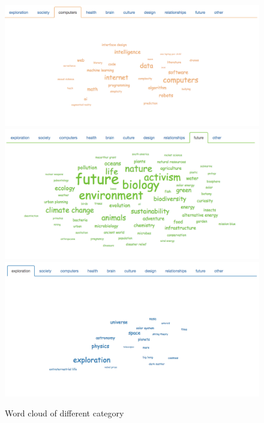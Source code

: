\documentclass{report}
\numberwithin{figure}{section}
\begin{document}
\begin{figure}
\begin{center}
\includegraphics[scale=0.3]{ccomputers}
\includegraphics[scale=0.3]{cfuture}
\includegraphics[scale=0.3]{cexploration}
\caption{Word cloud of different category}
\label{fig:category}
\end{center}
\end{figure} 
\end{document}
